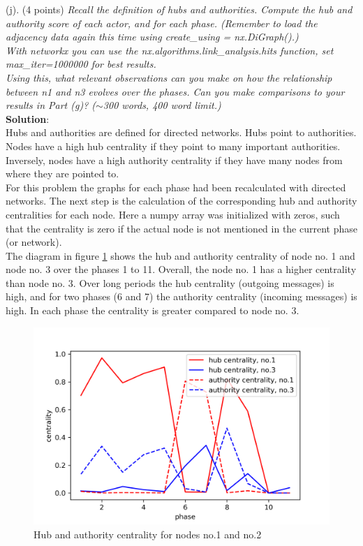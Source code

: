(j). (4 points) \textsl{Recall the definition of hubs and authorities. Compute the hub and authority score of each actor, and for each phase. (Remember to load the adjacency data again this time using create\_using = nx.DiGraph().)}\\
\textsl{With networkx you can use the nx.algorithms.link\_analysis.hits function, set max\_iter=1000000 for best results.}\\
\textsl{Using this, what relevant observations can you make on how the relationship between n1 and n3 evolves over the phases. Can you make comparisons to your results in Part (g)?  ($\sim$300 words, 400 word limit.)}\\

\textbf{Solution}:\\
Hubs and authorities are defined for directed networks. Hubs point to authorities. Nodes have a high hub centrality if they point to many important authorities. Inversely, nodes have a high authority centrality if they have many nodes from where they are pointed to.\cite{networks_an_introduction}\\

For this problem the graphs for each phase had been recalculated with directed networks. The next step is the calculation of the corresponding hub and authority centralities for each node. Here a numpy array was initialized with zeros, such that the centrality is zero if the actual node is not mentioned in the current phase (or network).\\

The diagram in figure \ref{fig:hubs_authorities} shows the hub and authority centrality of node no. 1 and node no. 3 over the phases 1 to 11. Overall, the node no. 1 has a higher centrality than node no. 3. Over long periods the hub centrality (outgoing messages) is high, and for two phases (6 and 7) the authority centrality (incoming messages) is high. In each phase the centrality is greater compared to node no. 3.\\

\begin{figure}[h]
	\centering
	\includegraphics[width=0.7\linewidth]{problem_02/hubs_authorities}
	\caption{Hub and authority centrality for nodes no.1 and no.2}
	\label{fig:hubs_authorities}
\end{figure}

